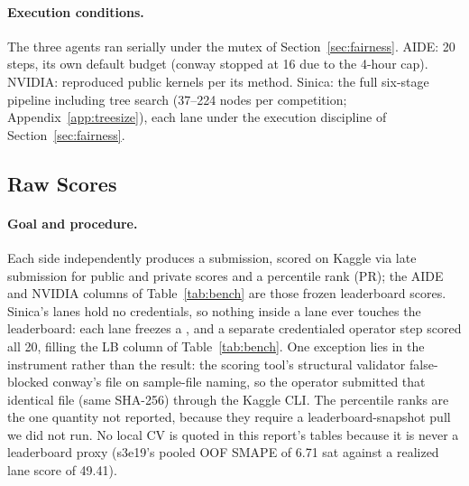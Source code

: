 \documentclass[11pt,a4paper]{article}
\begin{document}
\paragraph{Execution conditions.} The three agents ran serially under the mutex of Section~\ref{sec:fairness}. AIDE: 20 steps, its own default budget (conway stopped at 16 due to the 4-hour cap). NVIDIA: reproduced public kernels per its method. Sinica: the full six-stage pipeline including tree search (37--224 nodes per competition; Appendix~\ref{app:treesize}), each lane under the execution discipline of Section~\ref{sec:fairness}.

\subsection{Raw Scores}
\label{sec:exp1}

\paragraph{Goal and procedure.} Each side independently produces a submission, scored on Kaggle via late submission for public and private scores and a percentile rank (PR); the AIDE and NVIDIA columns of Table~\ref{tab:bench} are those frozen leaderboard scores. Sinica's lanes hold no credentials, so nothing inside a lane ever touches the leaderboard: each lane freezes a , and a separate credentialed operator step scored all 20, filling the LB column of Table~\ref{tab:bench}. One exception lies in the instrument rather than the result: the scoring tool's structural validator false-blocked conway's file on sample-file naming, so the operator submitted that identical file (same SHA-256) through the Kaggle CLI. The percentile ranks are the one quantity not reported, because they require a leaderboard-snapshot pull we did not run. No local CV is quoted in this report's tables because it is never a leaderboard proxy (s3e19's pooled OOF SMAPE of 6.71 sat against a realized lane score of 49.41).
\end{document}
